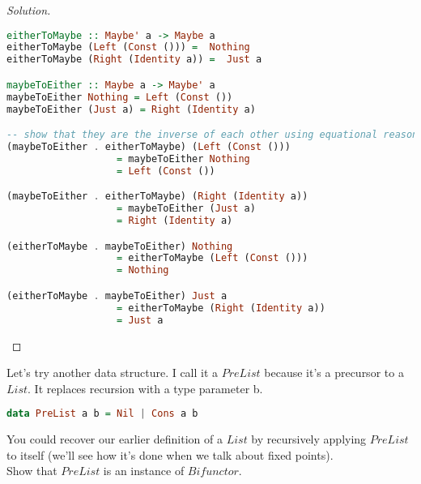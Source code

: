 \documentclass[7x10,thmnumcontwithchapter,WebLink,AddlevelTwoTOC,NumRef,BookEndNote,printer]{pupbook}
\begin{document}
\begin{proof}[Solution]
	~\\
\begin{lstlisting}[language=Haskell]
eitherToMaybe :: Maybe' a -> Maybe a
eitherToMaybe (Left (Const ())) =  Nothing
eitherToMaybe (Right (Identity a)) =  Just a

maybeToEither :: Maybe a -> Maybe' a
maybeToEither Nothing = Left (Const ())
maybeToEither (Just a) = Right (Identity a) 

-- show that they are the inverse of each other using equational reasoning
(maybeToEither . eitherToMaybe) (Left (Const ())) 
                   = maybeToEither Nothing
                   = Left (Const ())

(maybeToEither . eitherToMaybe) (Right (Identity a))
                   = maybeToEither (Just a)
                   = Right (Identity a)

(eitherToMaybe . maybeToEither) Nothing
                   = eitherToMaybe (Left (Const ()))
                   = Nothing

(eitherToMaybe . maybeToEither) Just a
                   = eitherToMaybe (Right (Identity a))
                   = Just a
\end{lstlisting}
	
\end{proof}



\begin{exercise}
Let’s try another data structure. I call it a $PreList$ because it’s a precursor to a $List$. It replaces recursion with a type parameter b.
\begin{lstlisting}[language=Haskell]
data PreList a b = Nil | Cons a b
\end{lstlisting}
You could recover our earlier definition of a $List$ by recursively applying $PreList$ to itself (we’ll see how it’s done when we talk about fixed points). \\
Show that $PreList$ is an instance of $Bifunctor$.
\end{exercise}
\end{document}
